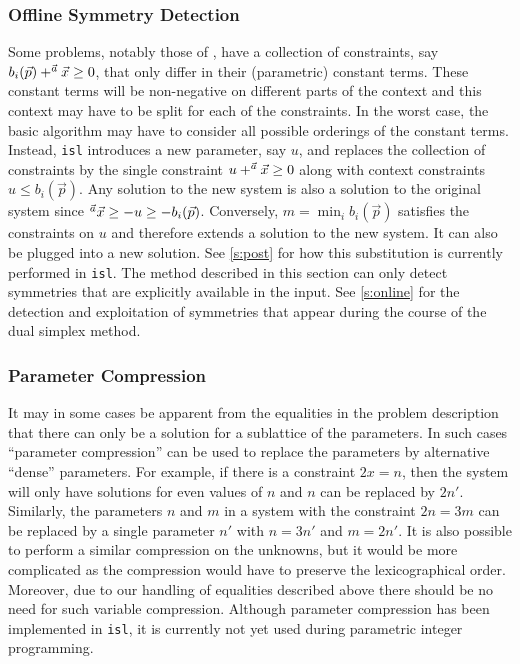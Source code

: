 \subsubsection{Offline Symmetry Detection}\label{s:offline}

Some problems, notably those of ,
have a collection of constraints, say
$b_i(\vec p) + \sp {\vec a} {\vec x} \ge 0$,
that only differ in their (parametric) constant terms.
These constant terms will be non-negative on different parts
of the context and this context may have to be split for each
of the constraints.  In the worst case, the basic algorithm may
have to consider all possible orderings of the constant terms.
Instead, {\tt isl} introduces a new parameter, say $u$, and
replaces the collection of constraints by the single
constraint $u + \sp {\vec a} {\vec x} \ge 0$ along with
context constraints $u \le b_i(\vec p)$.
Any solution to the new system is also a solution
to the original system since
$\sp {\vec a} {\vec x} \ge -u \ge -b_i(\vec p)$.
Conversely, $m = \min_i b_i(\vec p)$ satisfies the constraints
on $u$ and therefore extends a solution to the new system.
It can also be plugged into a new solution.
See \autoref{s:post} for how this substitution is currently performed
in {\tt isl}.
The method described in this section can only detect symmetries
that are explicitly available in the input.
See \autoref{s:online} for the detection
and exploitation of symmetries that appear during the course of
the dual simplex method.

\subsubsection{Parameter Compression}\label{s:compression}

It may in some cases be apparent from the equalities in the problem
description that there can only be a solution for a sublattice
of the parameters.  In such cases ``parameter compression''
 can be used to replace
the parameters by alternative ``dense'' parameters.
For example, if there is a constraint $2x = n$, then the system
will only have solutions for even values of $n$ and $n$ can be replaced
by $2n'$.  Similarly, the parameters $n$ and $m$ in a system with
the constraint $2n = 3m$ can be replaced by a single parameter $n'$
with $n=3n'$ and $m=2n'$.
It is also possible to perform a similar compression on the unknowns,
but it would be more complicated as the compression would have to
preserve the lexicographical order.  Moreover, due to our handling
of equalities described above there should be
no need for such variable compression.
Although parameter compression has been implemented in {\tt isl},
it is currently not yet used during parametric integer programming.

